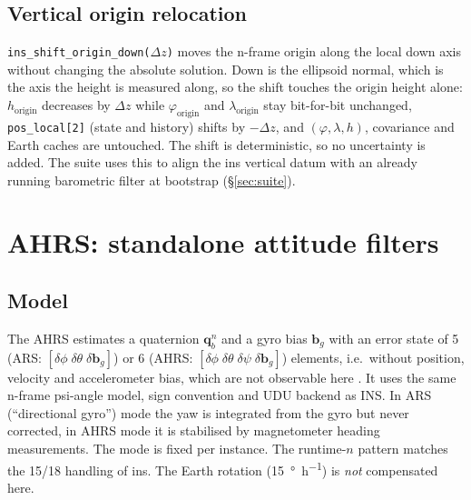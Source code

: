 \documentclass[11pt,a4paper]{article}
\newcommand{\vect}[1]{\bm{#1}}
\newcommand{\nframe}{n}
\newcommand{\bframe}{b}
\newcommand{\qbn}{\vect{q}_{\bframe}^{\nframe}}
\newcommand{\code}[1]{\texttt{#1}}
\begin{document}
\subsection{Vertical origin relocation}
\label{sec:origin-shift}

\code{ins\_\allowbreak{}shift\_\allowbreak{}origin\_\allowbreak{}down($\Delta z$)} moves the n-frame origin
along the local down axis without changing the absolute solution. Down is
the ellipsoid normal, which is the axis the height is measured along, so
the shift touches the origin height alone: $h_{\text{origin}}$ decreases by
$\Delta z$ while $\varphi_{\text{origin}}$ and $\lambda_{\text{origin}}$ stay
bit-for-bit unchanged, \code{pos\_\allowbreak{}local[2]} (state and history) shifts by
$-\Delta z$, and $(\varphi,\lambda,h)$, covariance and Earth caches are
untouched. The shift is deterministic, so no uncertainty is added.
The suite uses this to align the ins vertical datum with an
already running barometric filter at bootstrap (\S\ref{sec:suite}).

\section{AHRS: standalone attitude filters}

\subsection{Model}

The AHRS estimates a quaternion $\qbn$ and a gyro bias $\vect{b}_g$
with an error state of 5 (ARS: $[\delta\phi\;\delta\theta\;
\delta\vect{b}_g]$) or 6 (AHRS: $[\delta\phi\;\delta\theta\;\delta\psi\;
\delta\vect{b}_g]$) elements, i.e.\ without position, velocity and
accelerometer bias, which are not observable here \cite{wendel2011}. It uses the
same n-frame psi-angle model, sign convention and UDU backend as INS. In ARS
(``directional gyro'') mode the yaw is integrated from the gyro but never
corrected, in AHRS mode it is stabilised by magnetometer heading
measurements. The mode is fixed per instance. The runtime-$n$ pattern
matches the 15/18 handling of ins. The Earth rotation
(\SI{15}{\degree\per\hour}) is \emph{not} compensated here.
\end{document}

